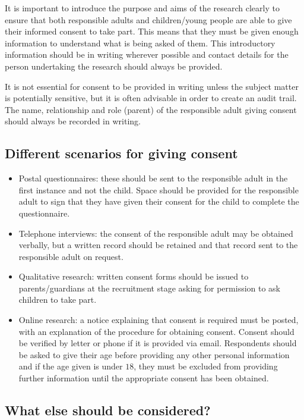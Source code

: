It is important to introduce the purpose and aims of the research clearly to ensure that both responsible adults and children/young people are able to give their informed consent to take part. This means that they must be given enough information to understand what is being asked of them. This introductory information should be in writing wherever possible and contact details for the person undertaking the research should always be provided.

It is not essential for consent to be provided in writing unless the subject matter is potentially sensitive, but it is often advisable in order to create an audit trail. The name, relationship and role (\eg parent) of the responsible adult giving consent should always be recorded in writing.

\subsection{Different scenarios for giving consent}

\begin{itemize}
	\item Postal questionnaires: these should be sent to the responsible adult in the first instance and not the child. Space should be provided for the responsible adult to sign that they have given their consent for the child to complete the questionnaire. 

	\item Telephone interviews: the consent of the responsible adult may be obtained verbally, but a written record should be retained and that record sent to the responsible adult on request.

	\item Qualitative research: written consent forms should be issued to parents/guardians at the recruitment stage asking for permission to ask children to take part.

	\item Online research: a notice explaining that consent is required must be posted, with an explanation of the procedure for obtaining consent. Consent should be verified by letter or phone if it is provided via email. Respondents should be asked to give their age before providing any other personal information and if the age given is under $ 18 $, they must be excluded from providing further information until the appropriate consent has been obtained.
\end{itemize}

\subsection{What else should be considered?}

